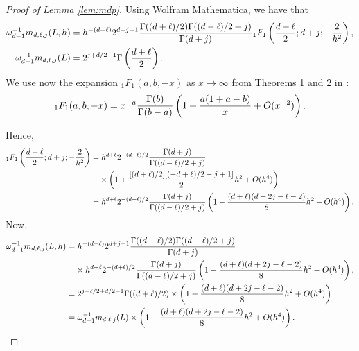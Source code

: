 \documentclass{article}
\begin{document}
\begin{proof}[Proof of Lemma \ref{lem:mdp}]
Using Wolfram Mathematica, we have that
\begin{align*}
    \omega_{d-1}^{-1}m_{d,\ell,j}(L,h)&=h^{-(d+\ell)} 2^{d+j-1} \frac{\Gamma((d+\ell)/2)\Gamma((d-\ell)/2+j)}{\Gamma(d+j)}{}_1F_1\left(\frac{d+\ell}{2};d+j;-\frac{2}{h^2}\right),\\
    \omega_{d-1}^{-1}m_{d,\ell,j}(L)&=2^{j+d/2-1} \Gamma \left(\frac{d+\ell}{2}\right).
\end{align*}
We use now the expansion ${}_1 F_1(a,b,-x)$ as $x\to\infty$ from Theorems 1 and 2 in \cite{Paris2013}:
\begin{align*}
    {}_1 F_1(a,b,-x)=x^{-a}\frac{\Gamma(b)}{\Gamma(b-a)}\left(1+\frac{a(1+a-b)}{x}+O(x^{-2})\right).
\end{align*}

Hence,
\begin{align*}
    {}_1 F_1\left(\frac{d+\ell}{2};d+j;-\frac{2}{h^2}\right)=&\; h^{d+\ell}2^{-(d+\ell)/2} \frac{\Gamma(d+j)}{\Gamma((d-\ell)/2+j)}\\
    &\times\left(1+\frac{[(d+\ell)/2][(-d+\ell)/2-j+1]}{2}h^2+O(h^{4})\right)\\
    =&\; h^{d+\ell}2^{-(d+\ell)/2} \frac{\Gamma(d+j)}{\Gamma((d-\ell)/2+j)}\left(1-\frac{(d+\ell)(d+2j-\ell-2)}{8}h^2+O(h^{4})\right).
\end{align*}
Now,
\begin{align*}
    \omega_{d-1}^{-1}m_{d,\ell,j}(L,h)=&\;h^{-(d+\ell)} 2^{d+j-1} \frac{\Gamma((d+\ell)/2)\Gamma((d-\ell)/2+j)}{\Gamma(d+j)}\\
    &\times h^{d+\ell}2^{-(d+\ell)/2} \frac{\Gamma(d+j)}{\Gamma((d-\ell)/2+j)}\left(1-\frac{(d+\ell)(d+2j-\ell-2)}{8}h^2+O(h^{4})\right),\\
    =&\;2^{j-\ell/2+d/2-1} \Gamma((d+\ell)/2)\times\left(1-\frac{(d+\ell)(d+2j-\ell-2)}{8}h^2+O(h^{4})\right)\\
    =&\;\omega_{d-1}^{-1}m_{d,\ell,j}(L)\times\left(1-\frac{(d+\ell)(d+2j-\ell-2)}{8}h^2+O(h^{4})\right).
\end{align*}
\end{proof}
\end{document}
